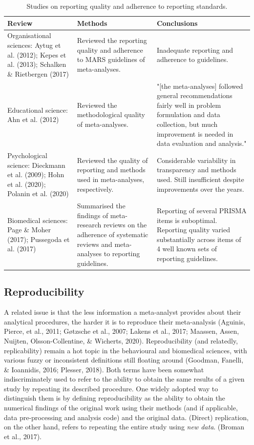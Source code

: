 \documentclass[
  man,floatsintext]{apa6}
\begin{document}
\renewcommand{\arraystretch}{2}
\singlespacing

\begin{longtable}[t]{>{\raggedright\arraybackslash}p{11em}>{\raggedright\arraybackslash}p{13em}>{\raggedright\arraybackslash}p{13em}}
\caption{\label{tab:table2}Studies on reporting quality and adherence to reporting standards.}\\
\toprule
Review & Methods & Conclusions\\
\midrule
Organisational sciences: Aytug et al. (2012); Kepes et al. (2013); Schalken \& Rietbergen (2017) & Reviewed the reporting quality and adherence to MARS guidelines of meta-analyses. & Inadequate reporting and adherence to guidelines.\\
Educational science: Ahn et al. (2012) & Reviewed the methodological quality of meta-analyses. & "[the meta-analyses] followed general recommendations fairly well in problem formulation and data collection, but much improvement is needed in data evaluation and analysis."\\
Psychological science: Dieckmann et al. (2009); Hohn et al. (2020); Polanin et al. (2020) & Reviewed the quality of reporting and methods used in meta-analyses, respectively. & Considerable variability in transparency and methods used. Still insufficient despite improvements over the years.\\
Biomedical sciences: Page \& Moher (2017); Pussegoda et al. (2017) & Summarised the findings of meta-research reviews on the adherence of systematic reviews and meta-analyses to reporting guidelines. & Reporting of several PRISMA items is suboptimal. Reporting quality varied substantially across items of 4 well known sets of reporting guidelines.\\
\bottomrule
\end{longtable}
\doublespacing

\hypertarget{reproducibility}{%
\subsection{Reproducibility}\label{reproducibility}}

A related issue is that the less information a meta-analyst provides about their analytical procedures, the harder it is to reproduce their meta-analysis (Aguinis, Pierce, et al., 2011; Gøtzsche et al., 2007; Lakens et al., 2017; Maassen, Assen, Nuijten, Olsson-Collentine, \& Wicherts, 2020). Reproducibility (and relatedly, replicability) remain a hot topic in the behavioural and biomedical sciences, with various fuzzy or inconsistent definitions still floating around (Goodman, Fanelli, \& Ioannidis, 2016; Plesser, 2018). Both terms have been somewhat indiscriminately used to refer to the ability to obtain the same results of a given study by repeating its described procedure. One widely adopted way to distinguish them is by defining reproducibility as the ability to obtain the numerical findings of the original work using their methods (and if applicable, data pre-processing and analysis code) and the original data. (Direct) replication, on the other hand, refers to repeating the entire study using \emph{new data}. (Broman et al., 2017).
\end{document}
